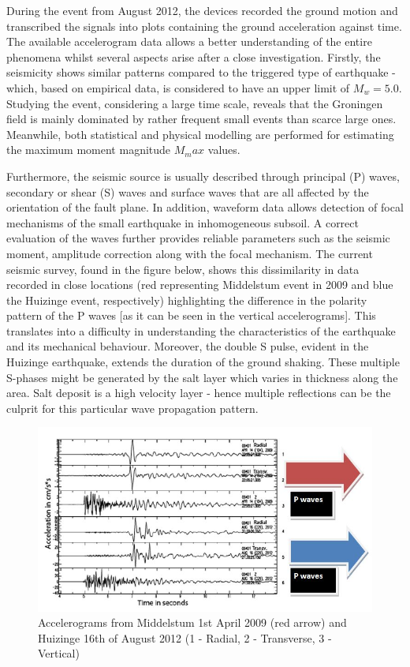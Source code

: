 \documentclass[12pt,a4paper]{report}
\begin{document}
During the event from August 2012, the devices recorded the ground motion and transcribed the signals into plots containing the ground acceleration against time. The available accelerogram data allows a better understanding of the entire phenomena whilst several aspects arise after a close investigation. Firstly, the seismicity shows similar patterns compared to the triggered type of earthquake - which, based on empirical data, is considered to have an upper limit of $M_w=5.0$. Studying the event, considering a large time scale, reveals that the Groningen field is mainly dominated by rather frequent small events than scarce large ones. Meanwhile, both statistical and physical modelling are performed for estimating the maximum moment magnitude $M_max$ values.

Furthermore, the seismic source is usually described through principal (P) waves, secondary or shear (S) waves and surface waves that are all affected by the orientation of the fault plane. In addition, waveform data allows detection of focal mechanisms of the small earthquake in inhomogeneous subsoil. A correct evaluation of the waves further provides reliable parameters such as the seismic moment, amplitude correction along with the focal mechanism. The current seismic survey, found in the figure below, shows this dissimilarity in data recorded in close locations (red representing Middelstum event in 2009 and blue the Huizinge event, respectively) highlighting the difference in the polarity pattern of the P waves [as it can be seen in the vertical accelerograms]. This translates into a difficulty in understanding  the characteristics of the earthquake and its mechanical behaviour. Moreover, the double S pulse, evident in the Huizinge earthquake, extends the duration of the ground shaking. These multiple S-phases might be generated by the salt layer which varies in thickness along the area. Salt deposit is a high velocity layer - hence multiple reflections can be the culprit for this particular wave propagation pattern. 

\begin{figure}[h!]
	\centering
	\includegraphics[width=0.7\linewidth]{"Pwaves"}
	\caption[]{Accelerograms from Middelstum 1st April 2009 (red arrow) and Huizinge 16th of August 2012 (1 - Radial, 2 - Transverse, 3 - Vertical)}
	\label{Pwaves}
\end{figure}
\end{document}
